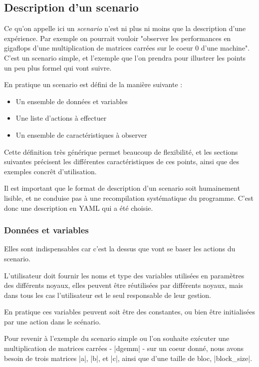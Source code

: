 \subsection{Description d'un scenario}

Ce qu'on appelle ici un \emph{scenario} n'est ni plus ni moins que la description d'une expérience.
Par exemple on pourrait vouloir "observer les performances en gigaflops d'une multiplication de matrices carrées sur le coeur 0 d'une machine".
C'est un scenario simple, et l'exemple que l'on prendra pour illustrer les points un peu plus formel qui vont suivre.

En pratique un scenario est défini de la manière suivante :
\begin{itemize}
 \item Un ensemble de données et variables
 \item Une liste d'actions à effectuer
 \item Un ensemble de caractéristiques à observer
\end{itemize}

Cette définition très générique permet beaucoup de flexibilité, et les sections suivantes précisent les différentes caractéristiques de ces points, ainsi que des exemples concrêt d'utilisation.

Il est important que le format de description d'un scenario soit humainement lisible, et ne conduise pas à une recompilation systématique du programme. C'est donc une description en YAML qui a été choisie.

\subsubsection{Données et variables}

Elles sont indispensables car c'est la dessus que vont se baser les actions du scenario.

L'utilisateur doit fournir les noms et type des variables utilisées en paramètres des différents noyaux, elles peuvent être réutilisées par différents noyaux, mais dans tous les cas l'utilisateur est le seul responsable de leur gestion.

En pratique ces variables peuvent soit être des constantes, ou bien être initialisées par une action dans le scénario.

Pour revenir à l'exemple du scenario simple ou l'on souhaite exécuter une multiplication de matrices carrées - |dgemm| - sur un coeur donné, nous avons besoin de trois matrices |a|, |b|, et |c|, ainsi que d'une taille de bloc, |block_size|.

